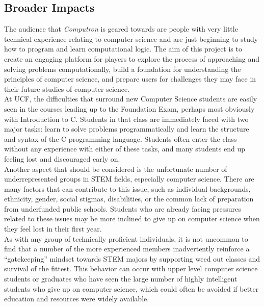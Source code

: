 \subsection{Broader Impacts}

The audience that \textit{Computron} is geared towards are people with very little technical experience relating to computer science and are just beginning to study how to program and learn computational logic. The aim of this project is to create an engaging platform for players to explore the process of approaching and solving problems computationally, build a foundation for understanding the principles of computer science, and prepare users for challenges they may face in their future studies of computer science.\\

At UCF, the difficulties that surround new Computer Science students are easily seen in the courses leading up to the Foundation Exam, perhaps most obviously with Introduction to C. Students in that class are immediately faced with two major tasks: learn to solve problems programmatically and learn the structure and syntax of the C programming language. Students often enter the class without any experience with either of these tasks, and many students end up feeling lost and discouraged early on.\\

Another aspect that should be considered is the unfortunate number of underrepresented groups in STEM fields, especially computer science. There are many factors that can contribute to this issue, such as individual backgrounds, ethnicity, gender, social stigmas, disabilities, or the common lack of preparation from underfunded public schools. Students who are already facing pressures related to these issues may be more inclined to give up on computer science when they feel lost in their first year.\\

As with any group of technically proficient individuals, it is not uncommon to find that a number of the more experienced members inadvertently reinforce a “gatekeeping” mindset towards STEM majors by supporting weed out classes and survival of the fittest. This behavior can occur with upper level computer science students or graduates who have seen the large number of highly intelligent students who give up on computer science, which could often be avoided if better education and resources were widely available.\\

